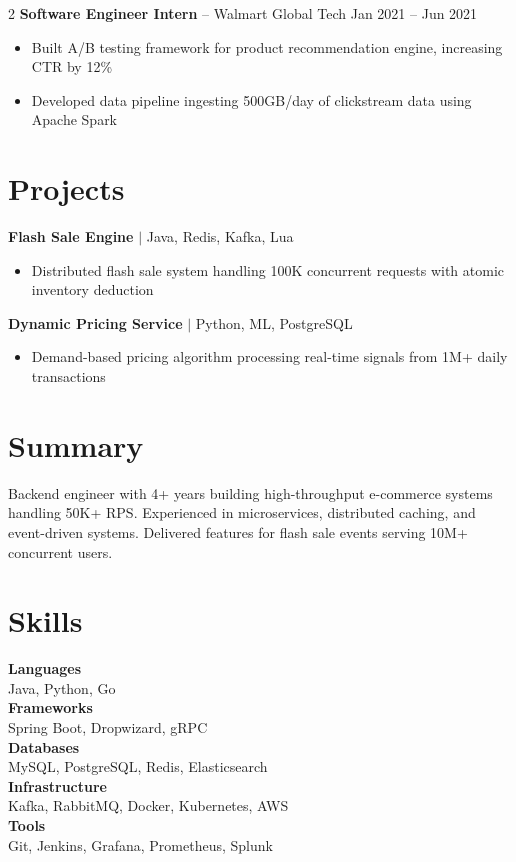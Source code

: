 \documentclass[9pt,a4paper]{article}
\begin{document}
\begin{paracol}{2}
\vspace{3pt}
{\bfseries Software Engineer Intern} -- Walmart Global Tech \hfill {\tiny\color{accent} Jan 2021 -- Jun 2021}
\begin{itemize}
    \item Built A/B testing framework for product recommendation engine, increasing CTR by 12\%
    \item Developed data pipeline ingesting 500GB/day of clickstream data using Apache Spark
\end{itemize}

\section{Projects}

{\bfseries Flash Sale Engine} {\tiny$\mid$ Java, Redis, Kafka, Lua}
\begin{itemize}
    \item Distributed flash sale system handling 100K concurrent requests with atomic inventory deduction
\end{itemize}

{\bfseries Dynamic Pricing Service} {\tiny$\mid$ Python, ML, PostgreSQL}
\begin{itemize}
    \item Demand-based pricing algorithm processing real-time signals from 1M+ daily transactions
\end{itemize}

\switchcolumn

\section{Summary}

{\footnotesize Backend engineer with 4+ years building high-throughput e-commerce systems handling 50K+ RPS. Experienced in microservices, distributed caching, and event-driven systems. Delivered features for flash sale events serving 10M+ concurrent users.}

\section{Skills}

{\footnotesize
\textbf{Languages}\\
Java, Python, Go\\[3pt]
\textbf{Frameworks}\\
Spring Boot, Dropwizard, gRPC\\[3pt]
\textbf{Databases}\\
MySQL, PostgreSQL, Redis, Elasticsearch\\[3pt]
\textbf{Infrastructure}\\
Kafka, RabbitMQ, Docker, Kubernetes, AWS\\[3pt]
\textbf{Tools}\\
Git, Jenkins, Grafana, Prometheus, Splunk
}


\end{paracol}
\end{document}
